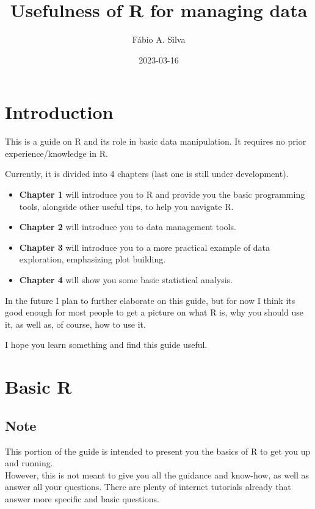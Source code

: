\documentclass[
]{book}
\title{Usefulness of R for managing data}
\author{Fábio A. Silva}
\date{2023-03-16}
\begin{document}
\maketitle

{
\setcounter{tocdepth}{1}
\tableofcontents
}
\hypertarget{introduction}{%
\chapter{Introduction}\label{introduction}}

This is a guide on R and its role in basic data manipulation.
It requires no prior experience/knowledge in R.

Currently, it is divided into 4 chapters (last one is still under development).

\begin{itemize}
\item
  \textbf{Chapter 1} will introduce you to R and provide you the basic programming tools, alongside other useful tips, to help you navigate R.
\item
  \textbf{Chapter 2} will introduce you to data management tools.
\item
  \textbf{Chapter 3} will introduce you to a more practical example of data exploration, emphasizing plot building.
\item
  \textbf{Chapter 4} will show you some basic statistical analysis.
\end{itemize}

In the future I plan to further elaborate on this guide, but for now I think its good enough for most people to get a picture on what R is, why you should use it, as well as, of course, how to use it.

I hope you learn something and find this guide useful.

\hypertarget{basic-r}{%
\chapter{Basic R}\label{basic-r}}

\hypertarget{note}{%
\section{Note}\label{note}}

This portion of the guide is intended to present you the basics of R to get you up and running.\\

However, this is not meant to give you all the guidance and know-how, as well as answer all your questions.
There are plenty of internet tutorials already that answer more specific and basic questions.\\
\end{document}

